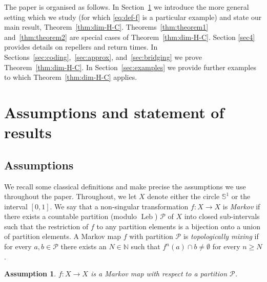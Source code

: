 \documentclass[english, 10pt]{amsart}
\numberwithin{equation}{section}
\theoremstyle{definition}
\theoremstyle{plain}
\newtheorem{assumption}{Assumption}
\theoremstyle{plain}
\theoremstyle{definition}
\theoremstyle{definition}
\theoremstyle{plain}
\theoremstyle{definition}
\newcommand{\Leb}{\operatorname{Leb}}
\newcommand{\cP}{{\mathcal P}}
\newcommand{\N}{{\mathbb N}}
\newcommand{\bN}{\N}
\numberwithin{equation}{section}
\begin{document}
The paper is organised as follows. In Section~\ref{sec:setup} we introduce the more general setting which we study (for which \eqref{eq:def-f} is a particular example)  and state our main result, Theorem~\ref{thm:dim-H-C}. Theorems~\ref{thm:theorem1} and~\ref{thm:theorem2} are special cases of Theorem~\ref{thm:dim-H-C}. Section \ref{sec4} provides details on repellers and return times. In Sections~\ref{sec:coding},~\ref{sec:approx}, and~\ref{sec:bridging} we prove Theorem~\ref{thm:dim-H-C}. In Section~\ref{sec:examples} we provide further examples to which Theorem~\ref{thm:dim-H-C} applies.

\section{Assumptions and statement of results}\label{sec:setup}

\subsection{Assumptions}

We recall some classical definitions and make precise the assumptions we use throughout the paper.
Throughout, we let $X$ denote either the circle $\mathbb{S}^1$ or the interval $[0,1]$.
We say that a non-singular transformation $f\colon X\to X$ is \emph{Markov} if there exists a countable partition (modulo $\Leb$) $\cP$  of $X$ into closed sub-intervals such that the restriction of $f$ to any partition elements is a bijection onto a union of partition elements. A Markov map $f$ with partition $\cP$ is \emph{topologically mixing} if for every $a,b \in \cP$ there exists an $N\in\bN$ such that $f^n (a) \cap b \neq \emptyset$ for every $n \geq N$. 

\begin{assumption}\label{asm:m}
$f\colon X \to X$ is a Markov map with respect to a partition $\cP$.
\end{assumption}
\end{document}
